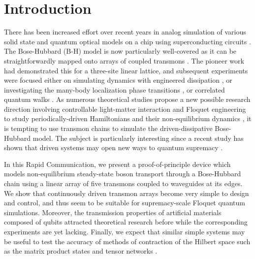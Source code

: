 \documentclass[%
 aps, pra,
 amsmath,amssymb,
 reprint,%
superscriptaddress
]{revtex4-2}
\begin{document}
\maketitle

\section{Introduction}


There has been increased effort over recent years in analog simulation of various solid state and quantum optical models on a chip using superconducting circuits \cite{kjaergaard2019superconducting}. The Bose-Hubbard (B-H) model is now particularly well-covered as it can be straightforwardly mapped onto arrays of coupled transmons \cite{orell2019probing}. The pioneer work \cite{hacohen2015cooling} had demonstrated this for a three-site linear lattice, and subsequent experiments were focused either on simulating dynamics with engineered dissipation \cite{ma2019dissipatively}, or investigating the many-body localization phase transitions \cite{roushan2017spectroscopic,chiaro2019growth}, or correlated quantum walks \cite{Yan2019, Ye2019}. As numerous theoretical studies propose a new possible research direction involving controllable light-matter interaction and Floquet engineering to study periodically-driven Hamiltonians and their non-equilibrium dynamics \cite{Goldman2014, eisert2015quantum, Zippilli2015, kyriienko2018floquet, franca2020simulating}, it is tempting to use transmon chains  to simulate the driven-dissipative Bose-Hubbard model. The subject is particularly interesting since a recent study has shown that driven systems may open new ways to quantum supremacy \cite{tangpanitanon2019quantum}.

In this Rapid Communication, we present a proof-of-principle device which models non-equilibrium steady-state boson transport through a Bose-Hubbard chain using a linear array of five transmons coupled to waveguides at its edges. We show that continuously driven transmon arrays become very simple to design and control, and thus seem to be suitable for supremacy-scale Floquet quantum simulations. Moreover, the transmission properties of artificial materials composed of qubits attracted theoretical research before \cite{Zagoskin2016, viehmann2013observing, Greenberg2015, Fistul2019, Biella2015} while the corresponding experiments are yet lacking. Finally, we expect that similar simple systems may be useful to test the accuracy of methods of contraction of the Hilbert space such as the matrix product states and tensor networks  \cite{Biella2015, orell2019probing, di2019efficient}.
\end{document}
